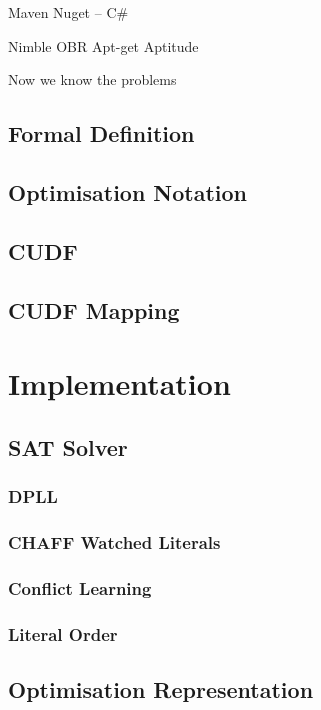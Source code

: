 \documentclass{report}
\begin{document}
Maven
Nuget -- C#

Nimble
OBR
Apt-get
Aptitude



Now we know the problems
\section{Formal Definition}

\section{Optimisation Notation}

\section{CUDF}

\section{CUDF Mapping}

\chapter{Implementation}

\section{SAT Solver}
\subsection{DPLL}
\subsection{CHAFF Watched Literals}
\subsection{Conflict Learning}
\subsection{Literal Order}

\section{Optimisation Representation}
\end{document}

